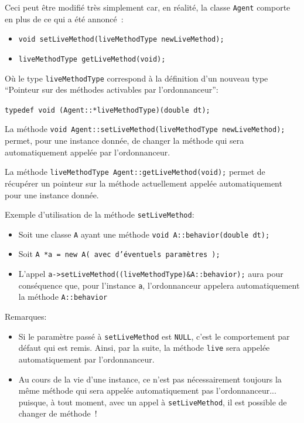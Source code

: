 \documentclass[12pt]{article}
\begin{document}
\vspace{0.3cm}

Ceci peut \^etre modifi\'e tr\`es simplement car,
en r\'ealit\'e, la classe {\tt Agent} comporte en plus de ce qui
a \'et\'e annonc\'e~:
\begin{itemize}
\item {\tt void setLiveMethod(liveMethodType newLiveMethod);}
\item {\tt liveMethodType getLiveMethod(void);}
\end{itemize}

O\`u le type {\tt liveMethodType} correspond \`a la d\'efinition
d'un nouveau type\\
``Pointeur sur des m\'ethodes activables par l'ordonnanceur'':
\begin{center}
{\tt typedef void (Agent::*liveMethodType)(double dt);}
\end{center}

\vspace{0.3cm}

La m\'ethode {\tt void Agent::setLiveMethod(liveMethodType newLiveMethod);}
permet, pour une instance donn\'ee, de changer la m\'ethode qui sera
automatiquement appel\'ee par l'ordonnanceur.

\vspace{0.1cm}

La m\'ethode {\tt liveMethodType Agent::getLiveMethod(void);} permet
de r\'ecup\'erer un pointeur sur la m\'ethode actuellement appel\'ee
automatiquement pour une instance donn\'ee.

\vspace{0.3cm}
Exemple d'utilisation de la m\'ethode {\tt setLiveMethod}:
\begin{itemize}
\item Soit une classe {\tt A} ayant une m\'ethode
{\tt void A::behavior(double dt);}
\item Soit {\tt A *a = new A( avec d'\'eventuels param\`etres );} 
\item L'appel {\tt a->setLiveMethod((liveMethodType)\&A::behavior);}
aura pour cons\'e\-quen\-ce que, pour l'instance {\tt a}, l'ordonnanceur
appelera automatiquement la m\'ethode {\tt A::behavior}
\end{itemize}

Remarques:
\begin{itemize}
\item Si le param\`etre pass\'e \`a {\tt setLiveMethod} est {\tt NULL},
c'est le comportement par d\'efaut qui est remis.
Ainsi, par la suite, la m\'ethode {\tt live} sera appel\'ee automatiquement
par l'ordonnanceur.
\item Au cours de la vie d'une instance, ce n'est pas n\'ecessairement
toujours la m\^eme m\'ethode qui sera appel\'ee automatiquement pas
l'ordonnanceur... puisque, \`a tout moment, avec un appel \`a
{\tt setLiveMethod}, il est possible de changer de m\'ethode~!

\end{itemize}
\end{document}
